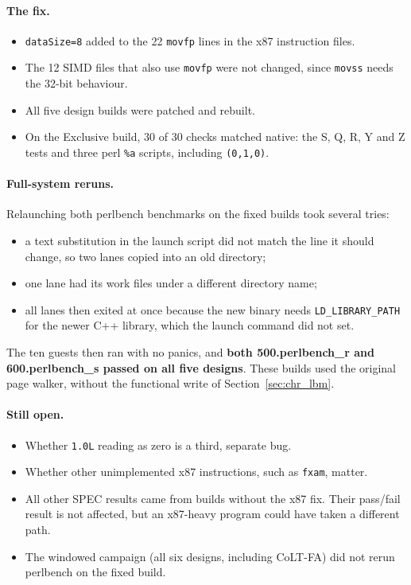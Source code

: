 \paragraph{The fix.}
\begin{itemize}
    \item \texttt{dataSize=8} added to the 22 \texttt{movfp} lines in the x87 instruction files.
    \item The 12 SIMD files that also use \texttt{movfp} were not changed, since \texttt{movss} needs the 32-bit behaviour.
    \item All five design builds were patched and rebuilt.
    \item On the Exclusive build, 30 of 30 checks matched native: the S, Q, R, Y and Z tests and three perl \texttt{\%a} scripts, including \texttt{(0,1,0)}.
\end{itemize}

\paragraph{Full-system reruns.} Relaunching both perlbench benchmarks on the fixed builds took several tries:
\begin{itemize}
    \item a text substitution in the launch script did not match the line it should change, so two lanes copied into an old directory;
    \item one lane had its work files under a different directory name;
    \item all lanes then exited at once because the new binary needs \texttt{LD\_LIBRARY\_PATH} for the newer C++ library, which the launch command did not set.
\end{itemize}
The ten guests then ran with no panics, and \textbf{both 500.perlbench\_r and 600.perlbench\_s passed on all five designs}. These builds used the original page walker, without the functional write of Section~\ref{sec:chr_lbm}.

\paragraph{Still open.}
\begin{itemize}
    \item Whether \texttt{1.0L} reading as zero is a third, separate bug.
    \item Whether other unimplemented x87 instructions, such as \texttt{fxam}, matter.
    \item All other SPEC results came from builds without the x87 fix. Their pass/fail result is not affected, but an x87-heavy program could have taken a different path.
    \item The windowed campaign (all six designs, including CoLT-FA) did not rerun perlbench on the fixed build.
\end{itemize}

